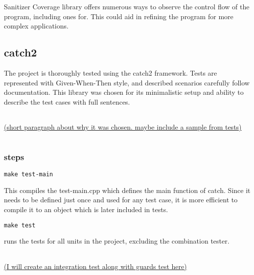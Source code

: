 \documentclass{elteikthesis}[2018/06/06]
\begin{document}
Sanitizer Coverage library offers numerous ways to observe the control flow of the program, including ones for. This could aid in refining the program for more complex applications. \\
\subsection{catch2}
\label{sec-3-2-2}
The project is thoroughly tested using the catch2 framework. Tests are represented with Given-When-Then style, and described scenarios carefully follow documentation. This library was chosen for its minimalistic setup and ability to describe the test cases with full sentences. \\
\begin{center}
\begin{tabular}{}
\\
\end{tabular}
\end{center}
\uline{(short paragraph about why it was chosen. maybe include a sample from tests)} \\
\begin{center}
\begin{tabular}{}
\\
\end{tabular}
\end{center}

\subsubsection{steps}
\label{sec-3-2-2-1}

\begin{verbatim}
make test-main
\end{verbatim}
This compiles the test-main.cpp which defines the main function of catch. Since it needs to be defined just once and used for any test case, it is more efficient to compile it to an object which is later included in tests. \\
\begin{verbatim}
make test
\end{verbatim}
runs the tests for all units in the project, excluding the combination tester. \\
\begin{center}
\begin{tabular}{}
\\
\\
\end{tabular}
\end{center}
\uline{(I will create an integration test along with guards test here)}  \\
\begin{center}
\begin{tabular}{}
\\
\\
\end{tabular}
\end{center}
\end{document}
